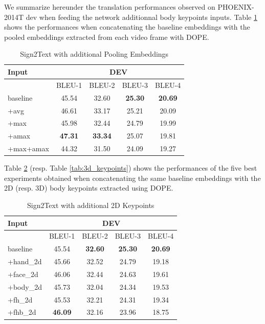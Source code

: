 \documentclass[final]{cvpr}
\begin{document}
We summarize hereunder the translation performances observed on PHOENIX-2014T dev when feeding the network additionnal body keypoints inputs. Table \ref{tab:embeddings} shows the performances when concatenating the baseline embeddings \cite{neccam} with the pooled embeddings extracted from each video frame with DOPE.
\begin{table}[H]
\centering
\def\arraystretch{0.9}
\begin{tabular}{l c c c c}
	\toprule
	Input &  \multicolumn{4}{c}{DEV}\\
	\midrule
	{}   & BLEU-1   & BLEU-2    & BLEU-3   & BLEU-4\\
	baseline   &  45.54 & 32.60  & \textbf{25.30}  & \textbf{20.69}\\
	+avg   &  46.61 & 33.17   & 25.21  & 20.09\\
	+max   &  45.98  &  32.44   & 24.79  & 19.99\\
	+amax  &  \textbf{47.31} &  \textbf{33.34}   & 25.07  & 19.81\\
	+max+amax  &  44.32 & 31.50  & 24.09  & 19.27\\
	\bottomrule
\end{tabular}
\caption{Sign2Text with additional Pooling Embeddings}
\label{tab:embeddings}
\end{table}
Table \ref{tab:2d_keypoints} (resp. Table \ref{tab:3d_keypoints}) shows the performances of the five best experiments obtained when concatenating the same baseline embeddings with the 2D (resp. 3D) body keypoints extracted using DOPE. 
\begin{table}[h]
	\centering
	\def\arraystretch{0.9}
	\begin{tabular}{l c c c c}
		\toprule
		Input &  \multicolumn{4}{c}{DEV}\\
		\midrule
		{}   & BLEU-1   & BLEU-2    & BLEU-3   & BLEU-4\\
		baseline  &  45.54 & \textbf{32.60}  & \textbf{25.30}  & \textbf{20.69}\\
		+hand\_2d   &  45.66 & 32.52   & 24.79  & 19.18\\
		+face\_2d   &  46.06  &  32.44   & 24.63  & 19.61\\
		+body\_2d   &  45.73 &  32.04   & 24.34  & 19.53\\	
		+fh\_2d\footnotemark[3]  &  45.53 &  32.21  & 24.31  & 19.34\\	
		+fhb\_2d\footnotemark[4] &  \textbf{46.09} &  32.16   & 23.96  & 18.75\\	
		\bottomrule
	\end{tabular}
	\caption{Sign2Text with additional 2D Keypoints}
	\label{tab:2d_keypoints}
\end{table}
\end{document}
